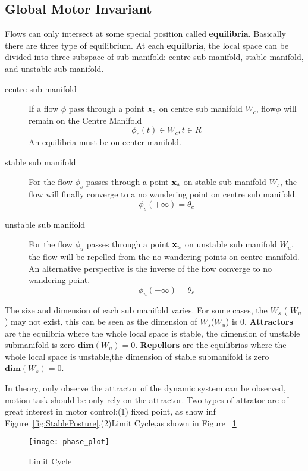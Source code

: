 \subsection{Global Motor Invariant}
Flows can only intersect at some special position called \textbf{equilibria}.
Basically there are three type of equilibrium.
At each \textbf{equilbria}, 
the local space can be divided into three subspace of sub manifold: centre sub manifold, stable manifold, and unstable sub manifold.
\begin{description} 
\item[centre sub manifold]
If a flow $\phi$ pass through a point $\mathbf{x}_{c}$ on centre sub manifold $W_{c}$,
flow$\phi$ will remain on the Centre Manifold 
\[
\phi_{c}(t) \in W_{c}, t \in R
\]
 An equilibria must be on center manifold. 
\item [stable sub manifold]
For the flow $\phi_{s}$ passes through a point $\mathbf{x}_{s}$ on stable sub manifold $W_{s}$, the flow will finally converge to a no wandering point on centre sub manifold.
\[
\phi_{s}(+\infty)=\theta_{c}
\]
\item[unstable sub manifold]
For the flow $\phi_u$ passes through a point $\mathbf{x}_u$ on unstable sub manifold $W_{u}$, the flow will be repelled from the no wandering points on centre manifold.
An alternative perspective is the inverse of the flow converge to no wandering point. 
\[
\phi_{u}(-\infty)=\theta_{c}
\] 

\end{description}

The size and dimension of each sub manifold varies.
For some cases, the $W_{s}$ ( $W_{u}$) may not exist, 
this can be seen as the dimension of $W_{s}$($W_{u}$) is $0$.
\textbf{Attractors} are the equilbria where the whole local space is stable, the dimension of unstable submanifold is zero $\mathbf{dim}(W_{u})=0$.
\textbf{Repellors} are the equilibrias where the whole local space is unstable,the dimension of stable submanifold is zero $\mathbf{dim}(W_{s})=0$.







In theory, only observe the attractor of the dynamic system can be observed, motion task should be only rely on the attractor.
Two types of attrator are of great interest in motor control:(1) fixed point, as show inf Figure~\ref{fig:StablePosture},(2)Limit Cycle,as shown in Figure ~\ref{fig:limit_circle}

\begin{figure}
\begin{center}
\texttt{[image: phase\_plot]}
\end{center}
\caption{Limit Cycle}
\label{fig:limit_circle}
\end{figure}




